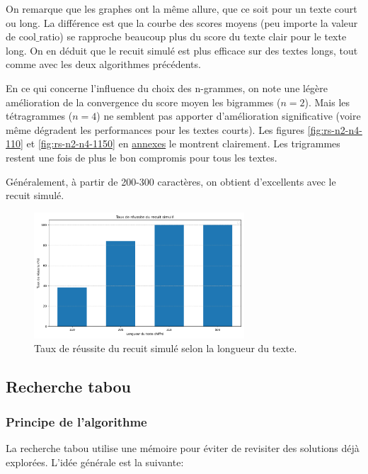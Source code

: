 \documentclass[a4paper]{article}
\begin{document}
On remarque que les graphes ont la même allure, que ce soit pour un texte court ou long. La différence est que la courbe des scores moyens (peu importe la valeur de \(\text{cool\_ratio}\)) se rapproche beaucoup plus du score du texte clair pour le texte long.
On en déduit que le recuit simulé est plus efficace sur des textes longs, tout comme avec les deux algorithmes précédents.


En ce qui concerne l'influence du choix des n-grammes, on note une légère amélioration de la convergence du score moyen les bigrammes ($n=2$). Mais les tétragrammes ($n=4$) ne semblent pas apporter d'amélioration significative (voire même dégradent les performances pour les textes courts). 
Les figures \ref{fig:rs-n2-n4-110} et \ref{fig:rs-n2-n4-1150} en \hyperref[sec:annexes]{annexes} le montrent clairement. Les trigrammes restent une fois de plus le bon compromis pour tous les textes.

Généralement, à  partir de 200-300 caractères, on obtient d'excellents avec le recuit simulé.

\begin{figure}[H]
    \centering
    \includegraphics[width=0.7\textwidth, keepaspectratio, height=0.6 \textheight]{taux_reussite_rs.png}
    \caption{Taux de réussite du recuit simulé selon la longueur du texte.}
    \label{fig:taux_reussite_rs}
\end{figure}


\subsection{Recherche tabou}
\subsubsection{Principe de l’algorithme}
La recherche tabou utilise une mémoire pour éviter de revisiter des solutions déjà explorées. L'idée générale est la suivante:
\end{document}
